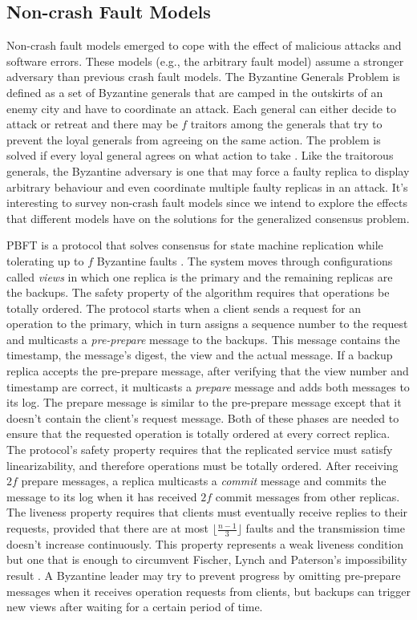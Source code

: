 \documentclass[runningheads,a4paper]{llncs}
\begin{document}
\subsection{Non-crash Fault Models} \label{Non-Crash}
Non-crash fault models emerged to cope with the effect of malicious attacks and software errors. These models (e.g., the arbitrary fault model) assume a stronger adversary than previous crash fault models. The Byzantine Generals Problem is defined as a set of Byzantine generals that are camped in the outskirts of an enemy city and have to coordinate an attack. Each general can either decide to attack or retreat and there may be $f$ traitors among the generals that try to prevent the loyal generals from agreeing on the same action. The problem is solved if every loyal general agrees on what action to take \cite{Lamport1982}. Like the traitorous generals, the Byzantine adversary is one that may force a faulty replica to display arbitrary behaviour and even coordinate multiple faulty replicas in an attack. It's interesting to survey non-crash fault models since we intend to explore the effects that different models have on the solutions for the generalized consensus problem. \par
PBFT is a protocol that solves consensus for state machine replication while tolerating up to $f$ Byzantine faults \cite{Castro1999}. The system moves through configurations called \textit{views} in which one replica is the primary and the remaining replicas are the backups. The safety property of the algorithm requires that operations be totally ordered. The protocol starts when a client sends a request for an operation to the primary, which in turn assigns a sequence number to the request and multicasts a \textit{pre-prepare} message to the backups. This message contains the timestamp, the message's digest, the view and the actual message. If a backup replica accepts the pre-prepare message, after verifying that the view number and timestamp are correct, it multicasts a \textit{prepare} message and adds both messages to its log. The prepare message is similar to the pre-prepare message except that it doesn't contain the client's request message. Both of these phases are needed to ensure that the requested operation is totally ordered at every correct replica. The protocol's safety property requires that the replicated service must satisfy linearizability, and therefore operations must be totally ordered. After receiving $2f$ prepare messages, a replica multicasts a \textit{commit} message and commits the message to its log when it has received $2f$ commit messages from other replicas. The liveness property requires that clients must eventually receive replies to their requests, provided that there are at most $\lfloor\frac{n-1}{3}\rfloor$ faults and the transmission time doesn't increase continuously. This property represents a weak liveness condition but one that is enough to circumvent Fischer, Lynch and Paterson's impossibility result \cite{Fischer1985}. A Byzantine leader may try to prevent progress by omitting pre-prepare messages when it receives operation requests from clients, but backups can trigger new views after waiting for a certain period of time. \par
\end{document}
